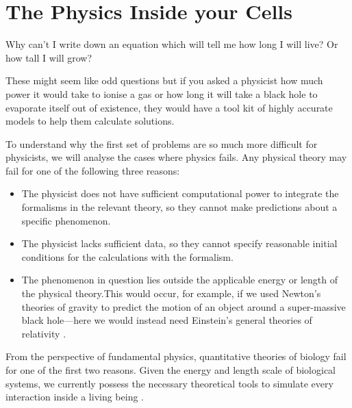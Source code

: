 

\section{The Physics Inside your Cells}

Why can't I write down an equation which will tell me how long I will live? Or how tall I will grow?

These might seem like odd questions but if you asked a physicist how much power it would take to ionise a gas or how long it will take a black hole to evaporate itself out of existence, they would have a tool kit of highly accurate models to help them calculate solutions. 

To understand why the first set of problems are so much more difficult for physicists, we will analyse the cases where physics fails. Any physical theory may fail for one of the following three reasons: 

\begin{itemize} 
	\item The physicist does not have sufficient computational power to integrate the formalisms in the relevant theory, so they cannot make predictions about a specific phenomenon.

		\item The physicist lacks sufficient data, so they cannot specify reasonable initial conditions for the calculations with the formalism. 

		\item The phenomenon in question lies outside the applicable energy or length of the physical theory.This would occur, for example, if we used Newton's theories of gravity to predict the motion of an object around a super-massive black hole---here we would instead need Einstein's general theories of relativity \cite{picker2022}.

\end{itemize}

From the perspective of fundamental physics, quantitative theories of biology fail for one of the first two reasons. Given the energy and length scale of biological systems, we currently possess the necessary theoretical tools to simulate every interaction inside a living being \cite{carroll2021}. 

